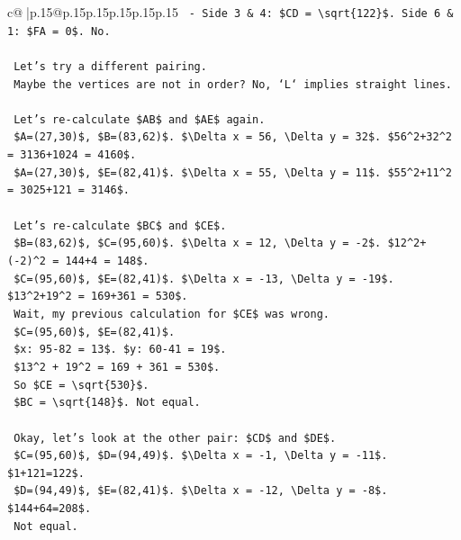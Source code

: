 \documentclass{article}
\begin{document}
{\begin{supertabular}{c@{$\;$}|p{.15\linewidth}@{}p{.15\linewidth}p{.15\linewidth}p{.15\linewidth}p{.15\linewidth}p{.15\linewidth}}
{{{\texttt{    {-} Side 3 \& 4: \$CD = \textbackslash{}sqrt\{122\}\$. Side 6 \& 1: \$FA = 0\$. No.} \\
\\ 
\texttt{    Let's try a different pairing.} \\
\texttt{    Maybe the vertices are not in order? No, `L` implies straight lines.} \\
\\ 
\texttt{    Let's re{-}calculate \$AB\$ and \$AE\$ again.} \\
\texttt{    \$A=(27,30)\$, \$B=(83,62)\$. \$\textbackslash{}Delta x = 56, \textbackslash{}Delta y = 32\$. \$56\^{}2+32\^{}2 = 3136+1024 = 4160\$.} \\
\texttt{    \$A=(27,30)\$, \$E=(82,41)\$. \$\textbackslash{}Delta x = 55, \textbackslash{}Delta y = 11\$. \$55\^{}2+11\^{}2 = 3025+121 = 3146\$.} \\
\\ 
\texttt{    Let's re{-}calculate \$BC\$ and \$CE\$.} \\
\texttt{    \$B=(83,62)\$, \$C=(95,60)\$. \$\textbackslash{}Delta x = 12, \textbackslash{}Delta y = {-}2\$. \$12\^{}2+({-}2)\^{}2 = 144+4 = 148\$.} \\
\texttt{    \$C=(95,60)\$, \$E=(82,41)\$. \$\textbackslash{}Delta x = {-}13, \textbackslash{}Delta y = {-}19\$. \$13\^{}2+19\^{}2 = 169+361 = 530\$.} \\
\texttt{    Wait, my previous calculation for \$CE\$ was wrong.} \\
\texttt{    \$C=(95,60)\$, \$E=(82,41)\$.} \\
\texttt{    \$x: 95{-}82 = 13\$. \$y: 60{-}41 = 19\$.} \\
\texttt{    \$13\^{}2 + 19\^{}2 = 169 + 361 = 530\$.} \\
\texttt{    So \$CE = \textbackslash{}sqrt\{530\}\$.} \\
\texttt{    \$BC = \textbackslash{}sqrt\{148\}\$. Not equal.} \\
\\ 
\texttt{    Okay, let's look at the other pair: \$CD\$ and \$DE\$.} \\
\texttt{    \$C=(95,60)\$, \$D=(94,49)\$. \$\textbackslash{}Delta x = {-}1, \textbackslash{}Delta y = {-}11\$. \$1+121=122\$.} \\
\texttt{    \$D=(94,49)\$, \$E=(82,41)\$. \$\textbackslash{}Delta x = {-}12, \textbackslash{}Delta y = {-}8\$. \$144+64=208\$.} \\
\texttt{    Not equal.} \\
\\ 
}}}
\end{supertabular}}
\end{document}
